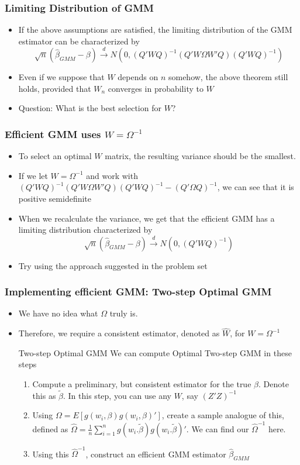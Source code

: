 \documentclass[aspectratio=169]{beamer}
\begin{document}
\begin{frame}
\frametitle{Limiting Distribution of GMM}
\begin{itemize}
\item  If the above assumptions are satisfied, the limiting distribution of the GMM estimator can be characterized by
\[
\sqrt{n}(\hat{\beta}_{GMM}-\beta)\xrightarrow{d}N(0,(Q'WQ)^{-1}(Q'W\Omega W'Q)(Q'WQ)^{-1})
\]
\item Even if we suppose that $W$ depends on $n$ somehow, the above theorem still holds, provided that $W_n$ converges in probability to $W$
\item Question: What is the best selection for $W$?
\end{itemize}
\end{frame}

\begin{frame}
\frametitle{Efficient GMM uses $W=\Omega^{-1}$}
\begin{itemize}
\item  To select an optimal $W$ matrix, the resulting variance should be the smallest. 
\item If we let $W=\Omega^{-1}$ and work with $(Q'WQ)^{-1}(Q'W\Omega W'Q)(Q'WQ)^{-1}-(Q'\Omega Q)^{-1}$, we can see that it is positive semidefinite
\item When we recalculate the variance, we get that the efficient GMM has a limiting distribution characterized by
\[
\sqrt{n}(\hat{\beta}_{GMM}-\beta)\xrightarrow{d}N(0,(Q'WQ)^{-1})
\]\par
\item Try using the approach suggested in the problem set
\end{itemize}
\end{frame}



\begin{frame}
\frametitle{Implementing efficient GMM: Two-step Optimal GMM}
\begin{itemize}
\item We have no idea what $\Omega$ truly is. 
\item Therefore, we require a consistent estimator, denoted as $\widehat{W}$, for $W=\Omega^{-1}$
\begin{block}{Two-step Optimal GMM}
We can compute Optimal Two-step GMM in these steps
\begin{enumerate}
\item Compute a preliminary, but consistent estimator for the true $\beta$. Denote this as $\tilde{\beta}$. In this step, you can use any $W$, say $(Z'Z)^{-1}$
\item Using $\Omega=E[g(w_i,\beta)g(w_i,\beta)']$, create a sample analogue of this, defined as $\widehat{\Omega}=\frac{1}{n}\sum_{i=1}^n g(w_i.\tilde{\beta})g(w_i.\tilde{\beta})'$. We can find our $\widehat{\Omega}^{-1}$ here. 
\item Using this $\widehat{\Omega}^{-1}$, construct an efficient GMM estimator $\hat{\beta}_{GMM}$
\end{enumerate}
\end{block}
\end{itemize}
\end{frame}
\end{document}
